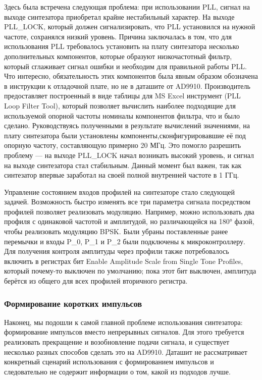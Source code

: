 \documentclass[rusmathsym, eqnumwithinsec, amspack, hyperref]{bomgost}
\begin{document}
Здесь была встречена следующая проблема: при использовании PLL, сигнал на выходе синтезатора приобретал крайне нестабильный характер. На выходе PLL\_LOCK, который должен сигнализировать, что PLL установился на нужной частоте, сохранялся низкий уровень. Причина заключалась в том, что для использования PLL требовалось установить на плату синтезатора несколько дополнительных компонентов, которые образуют низкочастотный фильтр, который сглаживает сигнал ошибки и необходим для правильной работы PLL. Что интересно, обязательность этих компонентов была явным образом обозначена в инструкции к отладочной плате, но не в даташите от AD9910. Производитель предоставляет построенный в виде таблицы для MS Excel инструмент (PLL Loop Filter Tool), который позволяет вычислить наиболее подходящие для используемой опорной частоты номиналы компонентов фильтра, что и было сделано. Руководствуясь полученными в результате вычислений значениями, на плату синтезатора были установлены компоненты,сконфигурировавшие её под опорную частоту, составляющую примерно 20 МГц. Это помогло разрешить проблему --- на выходе PLL\_LOCK начал возникать высокий уровень, и сигнал на выходе синтезатора стал стабильным. Данный момент был важен, так как синтезатор впервые заработал на своей полной внутренней частоте в 1 ГГц.

Управление состоянием входов профилей на синтезаторе стало следующей задачей. Возможность быстро изменять все три параметра сигнала посредством профилей позволяет реализовать модуляцию. Например, можно использовать два профиля с одинаковой частотой и амплитудой, но различающейся на 180° фазой, чтобы реализовать модуляцию BPSK. Были убраны поставленные ранее перемычки и входы P\_0, P\_1 и P\_2 были подключены к микроконтроллеру. Для получения контроля амплитуды через профили также потребовалось включить в регистрах бит Enable Amplitude Scale from Single Tone Profiles, который почему-то выключен по умолчанию; пока этот бит выключен, амплитуда берётся из общего для всех профилей вторичного регистра.

\subsubsection{Формирование коротких импульсов}

Наконец, мы подошли к самой главной проблеме использования синтезатора: формирование импульсов вместо непрерывных сигналов. Для этого требуется реализовать прекращение и возобновление подачи сигнала, и существует несколько разных способов сделать это на AD9910. Даташит не рассматривает конкретный сценарий использования с формированием импульсов и следовательно не содержит информации о том, какой из подходов лучше.
\end{document}
